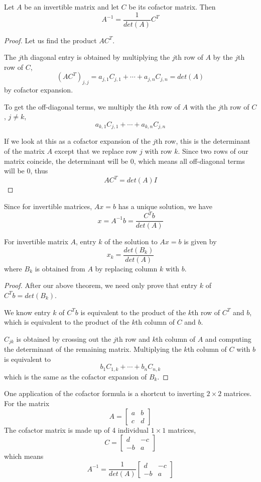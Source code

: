 \begin{theorem}
Let $A$ be an invertible matrix and let $C$ be its cofactor matrix. Then 
$$A^{-1} = \frac{1}{det(A)} C^{T}$$
\end{theorem}

\begin{proof}
Let us find the product $AC^{T}$. 

The $j$th diagonal entry is obtained by multiplying the $j$th row of $A$ by the $j$th row of $C$,
$$(AC^{T})_{j, j} = a_{j, 1} C_{j, 1} + \cdots + a_{j, n} C_{j, n} = det(A)$$
by cofactor expansion. 

To get the off-diagonal terms, we multiply the $k$th row of $A$ with the $j$th row of $C$, $j \neq k$, 
$$a_{k, 1} C_{j, 1} + \cdots + a_{k, n} C_{j, n}$$

If we look at this as a cofactor expansion of the $j$th row, this is the determinant of the matrix $A$ except that we replace row $j$ with row $k$. Since two rows of our matrix coincide, the determinant will be 0, which means all off-diagonal terms will be 0, thus 
$$AC^{T} = det(A) I$$
\end{proof}

Since for invertible matrices, $Ax = b$ has a unique solution, we have 
$$x = A^{-1} b = \frac{C^{T}b}{det(A)}$$

\begin{theorem}
For invertible matrix $A$, entry $k$ of the solution to $Ax = b$ is given by 
$$x_{k} = \frac{det(B_{k})}{det(A)} $$
where $B_{k}$ is obtained from $A$ by replacing column $k$ with $b$. 
\end{theorem}

\begin{proof}
After our above theorem, we need only prove that entry $k$ of $C^{T}b = det(B_{k})$. 

We know entry $k$ of $C^{T} b$ is equivalent to the product of the $k$th row of $C^{T}$ and $b$, which is equivalent to the product of the $k$th column of $C$ and $b$. 

$C_{jk}$ is obtained by crossing out the $j$th row and $k$th column of $A$ and computing the determinant of the remaining matrix. Multiplying the $k$th column of $C$ with $b$ is equivalent to 
$$b_{1} C_{1, k} + \cdots + b_{n} C_{n, k}$$ 
which is the same as the cofactor expansion of $B_{k}$. 
\end{proof}

One application of the cofactor formula is a shortcut to inverting $2 \times 2$ matrices. 
For the matrix 
$$A = \begin{bmatrix}
a & b \\
c & d
\end{bmatrix}$$
The cofactor matrix is made up of 4 individual $1 \times 1$ matrices,
$$C = \begin{bmatrix}
d & -c \\
-b & a
\end{bmatrix}$$
which means 
$$A^{-1} = \frac{1}{det(A)} \begin{bmatrix}
d & -c \\
-b & a
\end{bmatrix}$$

